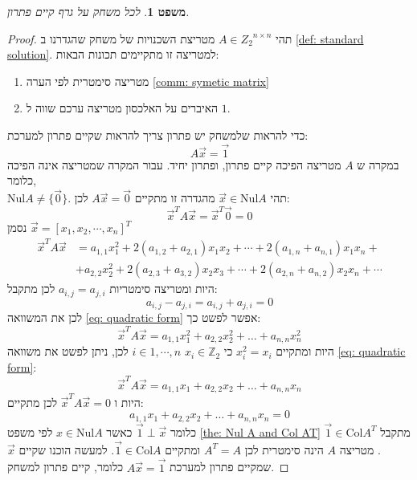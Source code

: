 \documentclass[12pt,leqno]{article}
\theoremstyle{theoremdd}
\newtheorem{theorem}{משפט}[section]
\newcommand{\Col}{\mathrm{Col}}
\newcommand{\Nul}{\mathrm{Nul}}
\begin{document}
\begin{theorem}
    \label{thrm: clean game has solution}
    לכל משחק על גרף קיים פתרון.
\end{theorem}
\begin{proof}
    תהי 
    $A \in {Z_2}^{n \times n}$
    מטריצת השכנויות 
    של משחק
    שהגדרנו
    ב
    \ref{def: standard solution}.
    למטריצה זו מתקיימים תכונות הבאות:
    \begin{enumerate}
        \item 
        מטריצה סימטרית לפי הערה
        \ref{comm: symetic matrix}
        \item 
        האיברים על האלכסון
        מטריצה 
        ערכם שווה ל
        $1$.
    \end{enumerate}

    כדי להראות שלמשחק יש פתרון 
    צריך להראות שקיים פתרון למערכת:
    \[A \vec{x} = \vec{1} \]
    במקרה ש 
    $A$
    מטריצה הפיכה קיים פתרון, ופתרון יחיד.
    עבור המקרה שמטריצה אינה הפיכה 
    כלומר,
    \\
    $\Nul A \neq \{ \vec{0}\}$.
    תהי 
    $\vec{x} \in \Nul A$
    מהגדרה זו מתקיים
    $A\vec{x} = \vec{0}$
    לכן:
    \[\vec{x}^T A \vec{x} = \vec{x}^T\vec{0} = 0\]
    נסמן 
    $\vec{x} = [x_1, x_2, \cdots, x_n]^T$
    \begin{align}
        \label{eq: quadratic form}
            \vec{x}^T A \vec{x} &= a_{1,1}x_1^2 + 2(a_{1,2} + a_{2,1})x_1x_2 + \cdots + 2(a_{1,n} + a_{n,1})x_1x_n +  \\
            \nonumber &+ a_{2,2}x_2^2 +  2(a_{2,3} + a_{3,2})x_2x_3 + \cdots  + 2(a_{2,n} + a_{n,2})x_2x_n + \cdots 
    \end{align}
    היות ומטריצה סימטריות
    $a_{i,j} = a_{j,i}$
    לכן
    מתקבל:
    \[a_{i,j} - a_{j,i} = a_{i,j} + a_{j,i} = 0 \]
    לכן
    את המשוואה 
    \ref{eq: quadratic form}
    אפשר לפשט כך:
    \[ \vec{x}^T A \vec{x} = a_{1,1}x_1^2 + a_{2,2} x_2^2 + \ldots +  a_{n,n} x_n^2\]
    היות ומתקיים
    $x_i^2 = x_i$
    כי
    $x_i \in \mathbb{Z}_2$
    $i \in 1, \cdots ,n$
    לכן, ניתן לפשט את משוואה 
    \ref{eq: quadratic form}:
    \[ \vec{x}^T A \vec{x} = a_{1,1}x_1 + a_{2,2} x_2 + \ldots + a_{n,n} x_n\]
    היות ו
    $ \vec{x}^T A \vec{x} = 0$
    לכן מתקיים:
    \[a_{1,1}x_1 + a_{2,2} x_2 + \ldots + a_{n,n} x_n = 0\]
    כלומר 
    $\vec{1} \perp  \vec{x}$
    כאשר 
    $x \in \Nul A$
    לפי משפט 
    \ref{the: Nul A and Col AT}
    מתקבל 
    $\vec{1} \in \Col A^T$.
    מטריצה
    $A$
    הינה
    סימטרית 
    לכן
    $A^T = A$
    ומתקיים
    $\vec{1} \in \Col A$.
    למעשה הוכנו 
    שקיים 
    $\vec x$
    שמקיים פתרון למערכת
    $A\vec{x} = \vec{1}$
    כלומר, קיים פתרון למשחק.
\end{proof}
\end{document}
